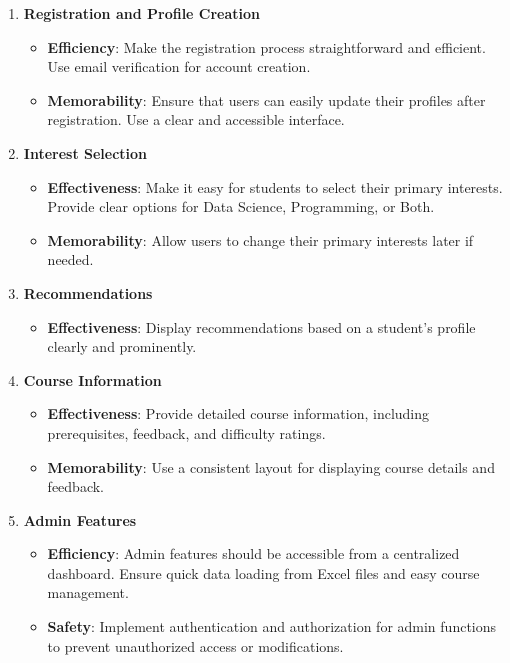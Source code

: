 \begin{enumerate}
    \item \textbf{Registration and Profile Creation}
        \begin{itemize}
            \tightlist
            \item \textbf{Efficiency}: Make the registration process straightforward and efficient. Use email verification for account creation.
            \item \textbf{Memorability}: Ensure that users can easily update their profiles after registration. Use a clear and accessible interface.
        \end{itemize}
    \item \textbf{Interest Selection}
        \begin{itemize}
            \tightlist
            \item \textbf{Effectiveness}: Make it easy for students to select their primary interests. Provide clear options for Data Science, Programming, or Both.
            \item \textbf{Memorability}: Allow users to change their primary interests later if needed.
        \end{itemize}
        
    \item \textbf{Recommendations}
        \begin{itemize}
            \tightlist
            \item \textbf{Effectiveness}: Display recommendations based on a student's profile clearly and prominently.
        \end{itemize}


\item \textbf{Course Information}
    \begin{itemize}
        \tightlist
        \item \textbf{Effectiveness}: Provide detailed course information, including prerequisites, feedback, and difficulty ratings.
        \item \textbf{Memorability}: Use a consistent layout for displaying course details and feedback.
    \end{itemize}


\item \textbf{Admin Features}
    \begin{itemize}
        \tightlist
        \item \textbf{Efficiency}: Admin features should be accessible from a centralized dashboard. Ensure quick data loading from Excel files and easy course management.
        \item \textbf{Safety}: Implement authentication and authorization for admin functions to prevent unauthorized access or modifications.
    \end{itemize}


\end{enumerate}

